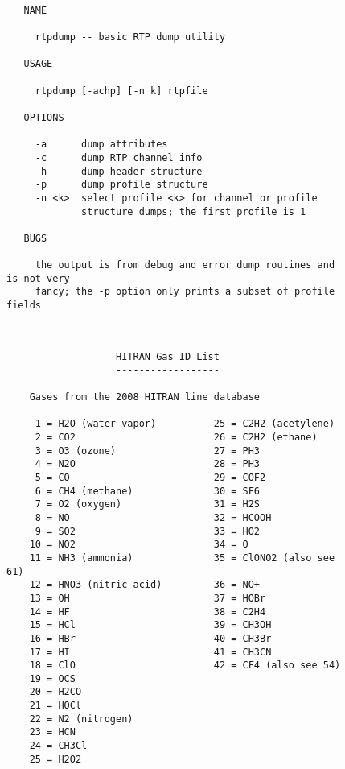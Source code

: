 \documentclass[12pt]{article}
\begin{document}
\begin{figure}
{\small
\begin{verbatim}

   NAME

     rtpdump -- basic RTP dump utility
  
   USAGE
  
     rtpdump [-achp] [-n k] rtpfile
  
   OPTIONS
  
     -a      dump attributes
     -c      dump RTP channel info
     -h      dump header structure
     -p      dump profile structure
     -n <k>  select profile <k> for channel or profile 
             structure dumps; the first profile is 1
  
   BUGS

     the output is from debug and error dump routines and is not very
     fancy; the -p option only prints a subset of profile fields
 
\end{verbatim}
}
\end{figure}
\begin{figure}
{\small
\begin{verbatim}

                   HITRAN Gas ID List
                   ------------------
                                    
    Gases from the 2008 HITRAN line database
    
     1 = H2O (water vapor)          25 = C2H2 (acetylene)
     2 = CO2                        26 = C2H2 (ethane)
     3 = O3 (ozone)                 27 = PH3
     4 = N2O                        28 = PH3
     5 = CO                         29 = COF2
     6 = CH4 (methane)              30 = SF6
     7 = O2 (oxygen)                31 = H2S
     8 = NO                         32 = HCOOH
     9 = SO2                        33 = HO2
    10 = NO2                        34 = O
    11 = NH3 (ammonia)              35 = ClONO2 (also see 61)
    12 = HNO3 (nitric acid)         36 = NO+
    13 = OH                         37 = HOBr
    14 = HF                         38 = C2H4
    15 = HCl                        39 = CH3OH
    16 = HBr                        40 = CH3Br
    17 = HI                         41 = CH3CN
    18 = ClO                        42 = CF4 (also see 54)
    19 = OCS
    20 = H2CO
    21 = HOCl
    22 = N2 (nitrogen)
    23 = HCN
    24 = CH3Cl
    25 = H2O2

\end{verbatim}
}
\end{figure}
\end{document}
